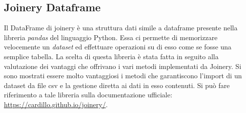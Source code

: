 \subsection{Joinery Dataframe}
Il DataFrame di joinery è una struttura dati simile a dataframe presente nella libreria \emph{pandas} del linguaggio Python.
Essa ci permette di memorizzare velocemente un \emph{dataset} ed effettuare operazioni su di esso come se fosse una semplice tabella.
La scelta di questa libreria è stata fatta in seguito alla valutazione dei vantaggi che offrivano i vari metodi implementati da Joinery.
Si sono mostrati essere molto vantaggiosi i metodi che garantiscono l'import di un dataset da file csv e la gestione diretta ai dati in esso contenuti.
Si può fare riferimento a tale libreria sulla documentazione ufficiale: \url{https://cardillo.github.io/joinery/}.